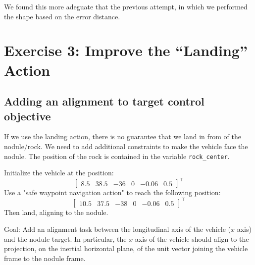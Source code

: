 \documentclass{article}
\begin{document}
We found this more adeguate that the previous attempt, in which we performed the shape based on the error distance.
\clearpage

\section{Exercise 3: Improve the “Landing” Action}
\subsection{Adding an alignment to target control objective}
If we use the landing action, there is no guarantee that we land in from of the nodule/rock. We need to add additional constraints to make the vehicle face the nodule. The position of the rock is contained in the variable \texttt{rock\_center}. 

Initialize the vehicle at the position:
\begin{displaymath}
\begin{bmatrix} 8.5 & 38.5 & -36 & 0 & -0.06 & 0.5 \end{bmatrix}^\top
\end{displaymath} 
Use a "safe waypoint navigation action" to reach the following position: 
\begin{displaymath}
\begin{bmatrix} 10.5 & 37.5 & -38 & 0 & -0.06 & 0.5 \end{bmatrix}^\top
\end{displaymath} 
Then land, aligning to the nodule.

Goal: Add an alignment task between the longitudinal axis of the vehicle ($x$ axis) and the nodule target. In particular, the $x$ axis of the vehicle should align to the projection, on the inertial horizontal plane, of the unit vector joining the vehicle frame to the nodule frame.
\end{document}
